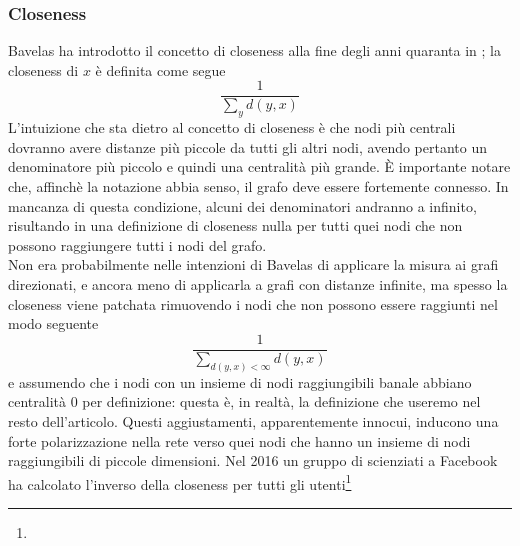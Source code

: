 \subsubsection{Closeness}
Bavelas ha introdotto il concetto di closeness alla fine degli anni quaranta in %
; la closeness di $x$ è definita come segue
\begin{equation}
    \frac{1}{\sum_y{d(y, x)}}
\end{equation}
L'intuizione che sta dietro al concetto di closeness è che nodi più centrali dovranno avere distanze più piccole da tutti gli altri nodi, avendo pertanto un denominatore più piccolo e quindi una centralità più grande. È importante notare che, affinchè la notazione abbia senso, il grafo deve essere fortemente connesso. In mancanza di questa condizione, alcuni dei denominatori andranno a infinito, risultando in una definizione di closeness nulla per tutti quei nodi che non possono raggiungere tutti i nodi del grafo.\\
Non era probabilmente nelle intenzioni di Bavelas di applicare la misura ai grafi direzionati, e ancora meno di applicarla a grafi con distanze infinite, ma spesso la closeness viene patchata rimuovendo i nodi che non possono essere raggiunti nel modo seguente
\begin{equation*}
    \frac{1}{\sum_{d(y, x) < \infty}d(y, x)}
\end{equation*}
e assumendo che i nodi con un insieme di nodi raggiungibili banale abbiano centralità 0 per definizione: questa è, in realtà, la definizione che useremo nel resto dell'articolo. Questi aggiustamenti, apparentemente innocui, inducono una forte polarizzazione nella rete verso quei nodi che hanno un insieme di nodi raggiungibili di piccole dimensioni. Nel 2016 un gruppo di scienziati a Facebook ha calcolato l'inverso della closeness per tutti gli utenti\footnote{%
}
